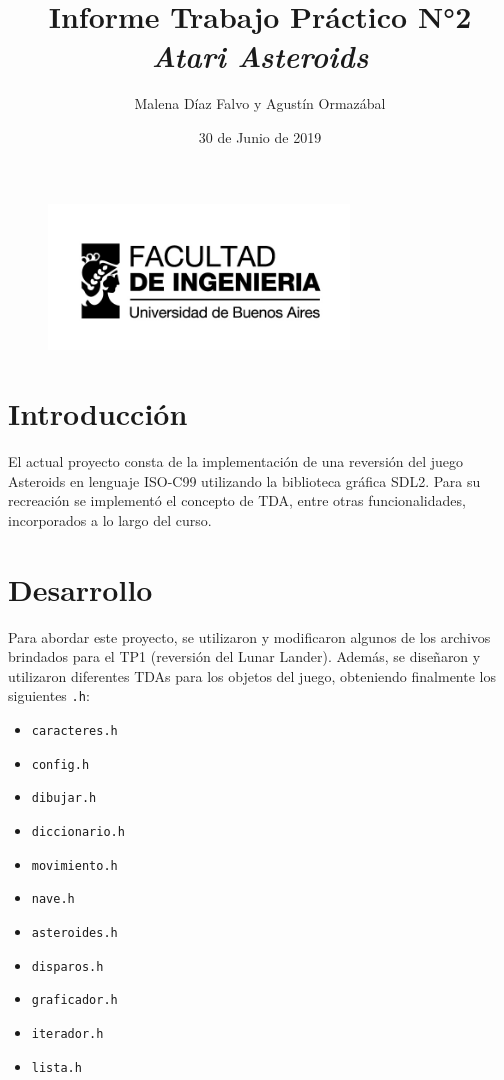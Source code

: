 \documentclass[a4paper, 12pt, spanish]{article}
\title{Informe Trabajo Práctico N°2 \linebreak \textit{Atari Asteroids} \linebreak}
\author{Malena Díaz Falvo y Agustín Ormazábal}
\date{30 de Junio de 2019}
\begin{document}
\begin{figure}[t]
	\includegraphics[width=8cm]{logoFIUBA} 
\end{figure}
\maketitle

\thispagestyle{empty}
\newpage

\setcounter{page}{2}
\pagestyle{plain}

\section*{Introducción}
El actual proyecto consta de la implementación de una reversión del juego
Asteroids en lenguaje ISO-C99 utilizando la biblioteca gráfica SDL2. Para su recreación
se implementó el concepto de TDA, entre otras funcionalidades, incorporados a lo largo
del curso. \newline
 
\section*{Desarrollo}
Para abordar este proyecto, se utilizaron y modificaron algunos de los archivos brindados para el TP1 (reversión del Lunar 
Lander). Además, se diseñaron y utilizaron diferentes TDAs para los objetos del juego, obteniendo finalmente los siguientes \texttt{.h}:

\begin{multicols}{2}
\begin{itemize}[label=$\bullet$]

	\item \texttt{caracteres.h}
	\item \texttt{config.h} 
	\item \texttt{dibujar.h}
	\item \texttt{diccionario.h}
	\item \texttt{movimiento.h}
	\item \texttt{nave.h}
	\item \texttt{asteroides.h}
	\item \texttt{disparos.h}
	\item \texttt{graficador.h}
	\item \texttt{iterador.h}
	\item \texttt{lista.h}
	

\end{itemize}
\end{multicols}
\medskip
\end{document}
